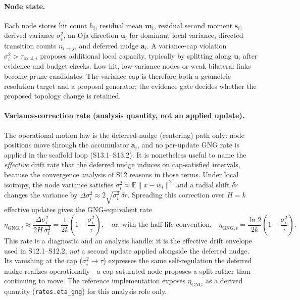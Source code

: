 \documentclass[11pt]{article}
\begin{document}
\paragraph{Node state.}
Each node stores hit count $h_i$, residual mean $\mathbf m_i$, residual second moment $\mathbf s_i$, derived variance $\sigma_i^2$, an Oja direction $\mathbf u_i$ for dominant local variance, directed transition counts $n_{i\to j}$, and deferred nudge $\mathbf a_i$. A variance-cap violation $\sigma_i^2>\tau_{\mathrm{local},i}$ proposes additional local capacity, typically by splitting along $\mathbf u_i$ after evidence and budget checks. Low-hit, low-variance nodes or weak bilateral links become prune candidates. The variance cap is therefore both a geometric resolution target and a proposal generator; the evidence gate decides whether the proposed topology change is retained.

\paragraph{Variance-correction rate (analysis quantity, not an applied update).}
The operational motion law is the deferred-nudge (centering) path only: node positions move through the accumulator $\mathbf a_i$, and no per-update GNG rate is applied in the scaffold loop (S13.1--S13.2). It is nonetheless useful to name the \emph{effective} drift rate that the deferred nudge induces on cap-satisfied intervals, because the convergence analysis of S12 reasons in those terms. Under local isotropy, the node variance satisfies $\sigma_i^2\approx \mathbb E\|x-w_i\|^2$ and a radial shift $\delta r$ changes the variance by $\Delta\sigma_i^2\approx 2\sqrt{\sigma_i^2}\,\delta r$. Spreading this correction over $H=k$ effective updates gives the GNG-equivalent rate
\[
\eta_{\mathrm{GNG},i}
\approx
\frac{\Delta\sigma_i^2}{2H\,\sigma_i^2}
=\frac{1}{2k}\!\left(1-\frac{\sigma_i^2}{\tau}\right),
\quad\text{or, with the half-life convention,}\quad
\eta_{\mathrm{GNG},i}=\frac{\ln 2}{2k}\!\left(1-\frac{\sigma_i^2}{\tau}\right).
\]
This rate is a diagnostic and an analysis handle: it is the effective drift envelope used in S12.1--S12.2, \emph{not} a second update applied alongside the deferred nudge. Its vanishing at the cap ($\sigma_i^2\to\tau$) expresses the same self-regulation the deferred nudge realizes operationally---a cap-saturated node proposes a split rather than continuing to move. The reference implementation exposes $\eta_{\mathrm{GNG}}$ as a derived quantity (\texttt{rates.eta\_gng}) for this analysis role only.
\end{document}

